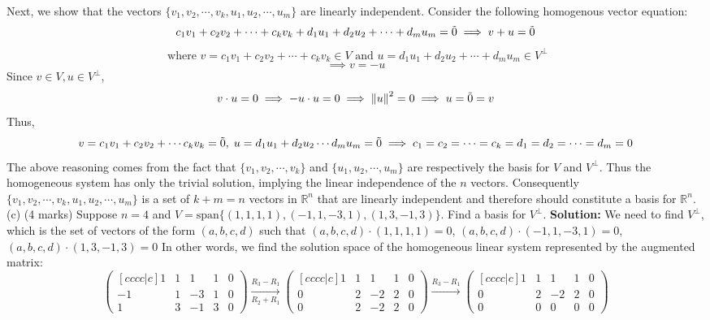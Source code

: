 \documentclass{article}
\DeclarePairedDelimiter\norm{\lVert}{\rVert}
\newcommand\norm[1]{\left\lVert#1\right\rVert}
\begin{document}
Next, we show that the vectors $\{v_1, v_2, \cdots , v_k, u_1, u_2, \cdots , u_m\}$ are linearly independent. Consider the following homogenous vector equation:
$$c_1v_1 +  c_2v_2 + \cdots + c_k v_k + d_1 u_1 + d_2u_2 + \cdots + d_m u_m = \Tilde{0} \implies v  + u = \Tilde{0}$$ $$ \text{ where } v = c_1v_1 +  c_2v_2 + \cdots + c_k v_k \in V \text{ and } u = d_1 u_1 + d_2u_2 + \cdots +  d_m u_m \in V^\perp$$
$$\implies v = - u$$
Since $v \in V, u \in V^\perp$, 
$$v \cdot u = 0\implies -u \cdot u = 0 \implies \norm{u}^2 = 0 \implies u = \Tilde{0} = v$$
Thus,
$$v = c_1v_1 +  c_2v_2 + \cdots c_k v_k = \Tilde{0}, \; u = d_1 u_1 + d_2u_2 \cdots d_m u_m = \Tilde{0} \implies c_1 = c_2 = \cdots = c_k = d_1 = d_2 = \cdots = d_m = 0$$
The above reasoning comes from the fact that $\{v_1, v_2, \cdots , v_k\}$ and $\{u_1, u_2, \cdots , u_m\}$ are respectively the basis for $V$ and $V^\perp$. Thus the homogeneous system has only the trivial solution, implying the linear independence of the $n$ vectors. Consequently $\{v_1, v_2, \cdots , v_k, u_1, u_2, \cdots , u_m\}$ is a set of $k + m = n$ vectors in $\mathbb{R}^n$ that are linearly independent and therefore should constitute a basis for $\mathbb{R}^n$.
\newline
\\ (c) (4 marks) Suppose $n = 4$ and
$V = \text{span}\{ (1, 1, 1, 1), (-1, 1, -3, 1), (1, 3, -1, 3) \}$. Find a basis for $V^\perp$.
\newline
\textbf{Solution:}
We need to find $V^\perp$, which is the set of vectors of the form $(a, b, c, d)$ such that $(a, b, c, d) \cdot (1, 1, 1, 1) = 0 $, $(a, b, c, d) \cdot (-1, 1, -3, 1) = 0 $, $ (a, b, c, d) \cdot (1, 3, -1, 3) = 0$ In other words, we find the solution space of the homogeneous linear system represented by the augmented matrix:
$$
\begin{pmatrix}[cccc|c]
    1 & 1 & 1 & 1 & 0 \\
    -1 & 1 & -3 & 1 & 0 \\
    1 & 3 & -1 & 3 & 0
\end{pmatrix}
\xrightarrow[R_2 + R_1]{R_3 - R_1}
\begin{pmatrix}[cccc|c]
    1 & 1 & 1 & 1 & 0 \\
    0 & 2 & -2 & 2 & 0 \\
    0 & 2 & -2 & 2 & 0
\end{pmatrix}
\xrightarrow{R_3 - R_1}
\begin{pmatrix}[cccc|c]
    1 & 1 & 1 & 1 & 0 \\
    0 & 2 & -2 & 2 & 0 \\
    0 & 0 & 0 & 0 & 0
\end{pmatrix}
$$
\end{document}
